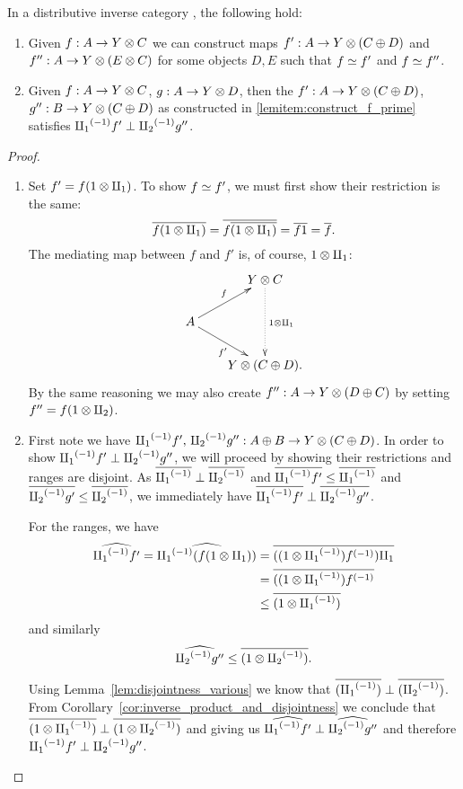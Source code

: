 \begin{lemma}\label{lem:maps_from_disjoint_sums_have_disjoint_equivalences}
  In a distributive inverse category \X, the following hold:
  \begin{enumerate}[{(}i{)}]
    \item Given $f : A \to Y\otimes C$  we can construct maps $f' : A \to Y \otimes (C\oplus D)$ and $f'':A\to Y \otimes
      (E\otimes C)$ for some objects $D, E$ such
      that $f \overset{\scriptscriptstyle }{\simeq} f'$ and $f \overset{\scriptscriptstyle }{\simeq} f''$.\label{lemitem:construct_f_prime}
    \item Given $f : A \to Y \otimes C$, $g : A\to Y \otimes D$, then the $f' : A \to Y \otimes (C\oplus D)$,
      $g'' : B \to Y \otimes (C\oplus D)$ as constructed in  \ref{lemitem:construct_f_prime} satisfies
      ${\amalg_{1}}^{(-1)} f' \perp {\amalg_{2}}^{(-1)} g''$.\label{lemitem:constructed_are_disjoint}
  \end{enumerate}
\end{lemma}
\begin{proof}
  \prepprooflist
  \begin{enumerate}[{(}i{)}]
  \item Set $f' = f(1\otimes\amalg_{1})$.
    To show $f\overset{\scriptscriptstyle }{\simeq} f'$, we must first show their restriction is the same:
    \[
      \overline{f(1\otimes\amalg_{1})} = \overline{f\overline{(1\otimes\amalg_{1})}} = \overline{f 1} =  \overline{f}.
    \]
    The mediating map between $f$ and $f'$ is, of course, $1\otimes\amalg_{1}$:
    \[
    \xymatrix @C=20pt @R=20pt{
      &  Y \* C \ar@{.>}[dd]^{1\*\cpa}\\
      A \ar[ur]^f \ar[dr]_{f'} \\
      & Y\*(C\+ D).
    }
    \]
  By the same reasoning we may also create $f'':A\to Y\otimes(D\oplus C)$ by setting $f'' = f(1\otimes\amalg_{2})$.
  \item First note we have ${\amalg_{1}}^{(-1)} f',\,{\amalg_{2}}^{(-1)} g'': A\oplus B \to Y\otimes(C\oplus D)$. In order to show  ${\amalg_{1}}^{(-1)} f'
    \perp {\amalg_{2}}^{(-1)} g''$, we will proceed by showing their restrictions and ranges are disjoint.
    As $\overline{{\amalg_{1}}^{(-1)}} \perp \overline{{\amalg_{2}}^{(-1)}}$ and $\overline{{\amalg_{1}}^{(-1)}f'} \le \overline{{\amalg_{1}}^{(-1)}}$ and
    $\overline{{\amalg_{2}}^{(-1)}g'} \le \overline{{\amalg_{2}}^{(-1)}}$, we immediately have
    $\overline{{\amalg_{1}}^{(-1)}f'} \perp \overline{{\amalg_{2}}^{(-1)}g''}$.

    For the ranges, we have
    \begin{align*}
      \widehat{{\amalg_{1}}^{(-1)} f'} = \widehat{{\amalg_{1}}^{(-1)} (f (1\otimes\amalg_{1}))} &=
      \overline{((1\otimes{\amalg_{1}}^{(-1)}){f}^{(-1)})\amalg_{1}}\\
      &= \overline{((1\otimes{\amalg_{1}}^{(-1)}){f}^{(-1)}}\\
      &\le \overline{(1\otimes{\amalg_{1}}^{(-1)})}
    \end{align*}
    and similarly
    \[
      \widehat{{\amalg_{2}}^{(-1)} g''} \le \overline{(1\otimes{\amalg_{2}}^{(-1)})}.
    \]

    Using Lemma~\ref{lem:disjointness_various}
    we know that $\overline{({\amalg_{1}}^{(-1)})}\perp \overline{({\amalg_{2}}^{(-1)})}$. From
    Corollary~\ref{cor:inverse_product_and_disjointness}
    we conclude that $\overline{(1\otimes{\amalg_{1}}^{(-1)})}\perp \overline{(1\otimes{\amalg_{2}}^{(-1)})}$ and giving us
    $\widehat{{\amalg_{1}}^{(-1)}f'} \perp \widehat{{\amalg_{2}}^{(-1)}g''}$ and therefore ${\amalg_{1}}^{(-1)}f' \perp {\amalg_{2}}^{(-1)}g''$.
  \end{enumerate}
\end{proof}
